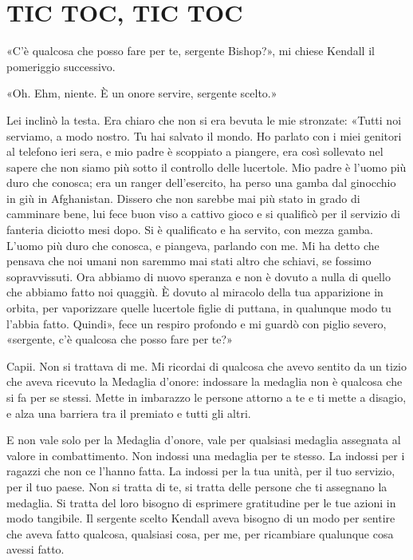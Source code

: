 \chapter{TIC TOC, TIC TOC}\label{tic-toc-tic-toc}

\hfill\break

«C'è qualcosa che posso fare per te, sergente Bishop?», mi chiese
Kendall il pomeriggio successivo.

«Oh. Ehm, niente. È un onore servire, sergente scelto.»

Lei inclinò la testa. Era chiaro che non si era bevuta le mie stronzate:
«Tutti noi serviamo, a modo nostro. Tu hai salvato il mondo. Ho parlato
con i miei genitori al telefono ieri sera, e mio padre è scoppiato a
piangere, era così sollevato nel sapere che non siamo più sotto il
controllo delle lucertole. Mio padre è l'uomo più duro che conosca; era
un ranger dell'esercito, ha perso una gamba dal ginocchio in giù in
Afghanistan. Dissero che non sarebbe mai più stato in grado di camminare
bene, lui fece buon viso a cattivo gioco e si qualificò per il servizio
di fanteria diciotto mesi dopo. Si è qualificato e ha servito, con mezza
gamba. L'uomo più duro che conosca, e piangeva, parlando con me. Mi ha
detto che pensava che noi umani non saremmo mai stati altro che schiavi,
se fossimo sopravvissuti. Ora abbiamo di nuovo speranza e non è dovuto a
nulla di quello che abbiamo fatto noi quaggiù. È dovuto al miracolo
della tua apparizione in orbita, per vaporizzare quelle lucertole figlie
di puttana, in qualunque modo tu l'abbia fatto. Quindi», fece un respiro
profondo e mi guardò con piglio severo, «sergente, c'è qualcosa che
posso fare per te?»

Capii. Non si trattava di me. Mi ricordai di qualcosa che avevo sentito
da un tizio che aveva ricevuto la Medaglia d'onore: indossare la
medaglia non è qualcosa che si fa per se stessi. Mette in imbarazzo le
persone attorno a te e ti mette a disagio, e alza una barriera tra il
premiato e tutti gli altri.

E non vale solo per la Medaglia d'onore, vale per qualsiasi medaglia
assegnata al valore in combattimento. Non indossi una medaglia per te
stesso. La indossi per i ragazzi che non ce l'hanno fatta. La indossi
per la tua unità, per il tuo servizio, per il tuo paese. Non si tratta
di te, si tratta delle persone che ti assegnano la medaglia. Si tratta
del loro bisogno di esprimere gratitudine per le tue azioni in modo
tangibile. Il sergente scelto Kendall aveva bisogno di un modo per
sentire che aveva fatto qualcosa, qualsiasi cosa, per me, per ricambiare
qualunque cosa avessi fatto.

